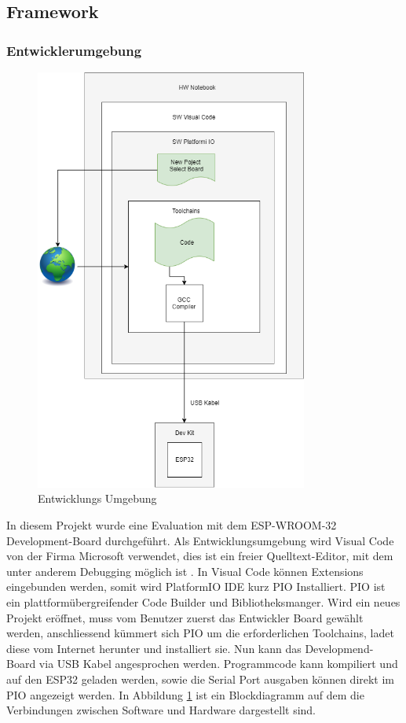 \subsection{Framework}\label{subsec: Framework}

\subsubsection{Entwicklerumgebung}
\begin{figure}[H]
	\centering
	\includegraphics[width=0.8\textwidth]{graphics/DevelopDiagram.png}
	\caption{Entwicklungs Umgebung}
	\label{pic: PIO}
\end{figure} 

In diesem Projekt wurde eine Evaluation mit dem ESP-WROOM-32 Development-Board durchgeführt. Als Entwicklungsumgebung wird Visual Code von der Firma Microsoft verwendet, dies ist ein freier Quelltext-Editor, mit dem unter anderem Debugging möglich ist \cite{noauthor_visual_nodate}. In Visual Code können Extensions eingebunden werden, somit wird PlatformIO IDE \cite{platformio_platformio_nodate} kurz PIO Installiert.
PIO ist ein plattformübergreifender Code Builder und Bibliotheksmanger. Wird ein neues Projekt eröffnet, muss vom Benutzer zuerst das Entwickler Board gewählt werden, anschliessend kümmert sich PIO um die erforderlichen Toolchains, ladet diese vom Internet herunter und installiert sie. Nun kann das Developmend-Board via USB Kabel angesprochen werden. Programmcode kann kompiliert und auf den ESP32 geladen werden, sowie die Serial Port ausgaben können direkt im PIO angezeigt werden. In Abbildung \ref{pic: PIO} ist ein Blockdiagramm auf dem die Verbindungen zwischen Software und Hardware dargestellt sind.

